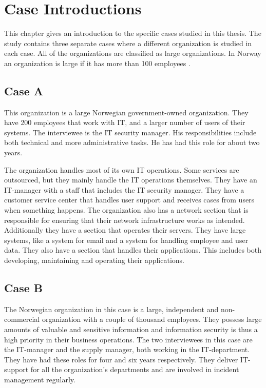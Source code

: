 \chapter{Case Introductions}
\label{chp:CaseIntroductions}
This chapter gives an introduction to the specific cases studied in this thesis. The study contains three separate cases where a different organization is studied in each case. All of the organizations are classified as large organizations. In Norway an organization is large if it has more than 100 employees \cite{SMB}.

\section{Case A}
This organization is a large Norwegian government-owned organization. They have 200 employees that work with IT, and a larger number of users of their systems. The interviewee is the IT security manager. His responsibilities include both technical and more administrative tasks. He has had this role for about two years.

The organization handles most of its own IT operations. Some services are outsourced, but they mainly handle the IT operations themselves. They have an IT-manager with a staff that includes the IT security manager. They have a customer service center %
that handles user support and receives cases from users when something happens. The organization also has a network section that is responsible for ensuring that their network infrastructure works as intended. Additionally they have  a section that operates their servers. They have large systems, like a system for email and a system for handling employee and user data. They also have a section that handles their applications. This includes both developing, maintaining and operating their applications.

\section{Case B}
The Norwegian organization in this case is a large, independent and non-commercial organization with a couple of thousand employees. They possess large amounts of valuable and sensitive information and information security is thus a high priority in their business operations. The two interviewees in this case are the IT-manager and the supply manager, both working in the IT-department. They have had these roles for four and six years respectively. They deliver IT-support for all the organization's departments and are involved in incident management regularly.   


